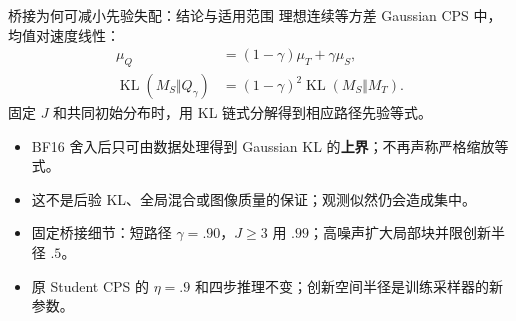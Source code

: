 \documentclass[10pt,aspectratio=169]{beamer}
\newcommand{\KL}{\operatorname{KL}}
\begin{document}
\begin{frame}{桥接为何可减小先验失配：结论与适用范围}
\small
理想连续等方差 Gaussian CPS 中，均值对速度线性：
\begin{align}
\mu_Q&=(1-\gamma)\mu_T+\gamma\mu_S,\\
\KL(M_S\Vert Q_\gamma)&=(1-\gamma)^2\KL(M_S\Vert M_T).
\end{align}
固定 $J$ 和共同初始分布时，用 KL 链式分解得到相应路径先验等式。
\begin{itemize}\itemsep5pt
\item BF16 舍入后只可由数据处理得到 Gaussian KL 的\textbf{上界}；不再声称严格缩放等式。
\item 这不是后验 KL、全局混合或图像质量的保证；观测似然仍会造成集中。
\item 固定桥接细节：短路径 $\gamma=.90$，$J\geq3$ 用 $.99$；高噪声扩大局部块并限创新半径 $.5$。
\item 原 Student CPS 的 $\eta=.9$ 和四步推理不变；创新空间半径是训练采样器的新参数。
\end{itemize}
\end{frame}
\end{document}
